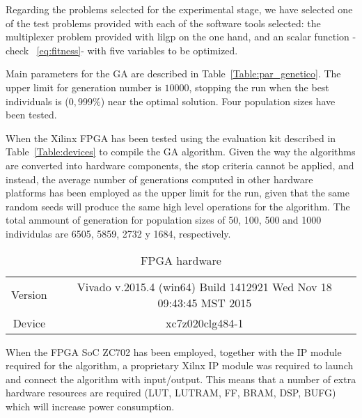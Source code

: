 Regarding the problems selected for the experimental stage, we have selected one of the test problems provided with each of the software tools selected:  the multiplexer problem provided with lilgp on the one hand, and an scalar function -check ~\ref{eq:fitness}-  with five variables to be optimized. 


Main parameters for the GA are described in Table~\ref{Table:par_genetico}.  The upper limit for generation number is  $10000$, stopping the run when the best individuals is ($0,999\%$) near the optimal solution. Four population sizes have been tested.

When the Xilinx FPGA has been tested using the evaluation kit described in Table~\ref{Table:devices} to compile the GA algorithm. Given the way the algorithms are converted into hardware components, the stop criteria cannot be applied, and instead, the average number of generations computed in other hardware platforms has been employed as the upper limit for the run, given that the same random seeds will produce the same high level operations for the algorithm.  The total ammount of generation for population sizes of 50, 100, 500 and 1000 individulas are  6505, 5859, 2732 y 1684, respectively.



\begin{table}
\renewcommand{\arraystretch}{1.3}
\centering
\caption{FPGA hardware}
\label{Table:fpga}
\begin{tabular}{cc} \hline
  Version & Vivado v.2015.4 (win64) Build 1412921 Wed Nov 18 09:43:45 MST 2015 \\ 
  Device & xc7z020clg484-1\\
\hline
\end{tabular}
\end{table}

When the FPGA SoC ZC702 has been employed, together with the IP module required for the algorithm, a proprietary Xilnx IP module was required to launch and connect the algorithm with input/output.  This means that a number of extra hardware resources are required (LUT, LUTRAM, FF, BRAM, DSP, BUFG) which will increase power consumption.  

